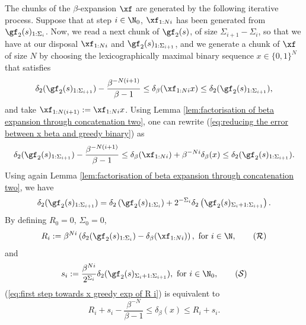 The chunks of the $\beta$-expansion $\xf$ are generated by the following iterative process. Suppose that at step $i \in \N_0$, $\xf_{1:Ni}$ has been generated from $\gf_2(s)_{1:\Sigma_i}$. Now, we read a next chunk of $\gf_2(s)$, of size $\Sigma_{i+1}-\Sigma_i$, so that we have at our disposal $\xf_{1:Ni}$ and $\gf_2(s)_{1:\Sigma_{i+1}}$, and we generate a chunk of $\xf$ of size $N$ by choosing the lexicographically maximal binary sequence $x \in \{0,1\}^N$ that satisfies 
\begin{equation}\label{eq:reducing the error between x beta and greedy binary}
	\delta_2(\gf_2(s)_{1:\Sigma_{i+1}}) - \frac{\beta^{-N(i+1)}}{\beta - 1} \leq \delta_\beta(\xf_{1:Ni}x) \leq \delta_2(\gf_2(s)_{1:\Sigma_{i+1}}),
\end{equation}
and take $\xf_{1:N(i+1)} := \xf_{1:Ni} x$. Using Lemma \ref{lem:factorisation of beta expansion through concatenation two}, one can rewrite (\ref{eq:reducing the error between x beta and greedy binary}) as
\begin{equation}\label{eq:first step towards x greedy exp of R i}
	\delta_2(\gf_2(s)_{1:\Sigma_{i+1}}) - \frac{\beta^{-N(i+1)}}{\beta - 1} \leq \delta_\beta(\xf_{1:Ni}) + \beta^{-Ni} \delta_\beta(x) \leq \delta_2(\gf_2(s)_{1:\Sigma_{i+1}}).
\end{equation}
Using again Lemma \ref{lem:factorisation of beta expansion through concatenation two}, we have
\begin{equation}\label{eq:factorisation binary expansion}
	\delta_2(\gf_2(s)_{1:\Sigma_{i+1}}) = \delta_2\left(\gf_2(s)_{1:\Sigma_{i}}\right) + 2^{-\Sigma_i}\delta_2\left(\gf_2(s)_{\Sigma_i+1:\Sigma_{i+1}}\right).
\end{equation}
By defining $R_0 = 0$, $\Sigma_0 = 0$,
\begin{equation}\label{eq:R i definition}
	R_i := \beta^{Ni}\left(\delta_2(\gf_2(s)_{1:\Sigma_{i}}) - \delta_\beta(\xf_{1:Ni})\right), \ \text{for} \ i \in \N,
	\tag{\text{$\mathcal{R}$}}
\end{equation}
and
\begin{equation}\label{eq:s i to generate beta expansion}
	s_i := \frac{\beta^{Ni}}{2^{\Sigma_i}}\delta_2(\gf_2(s)_{\Sigma_i+1:\Sigma_{i+1}}), \ \text{for} \ i \in \N_0,
	\tag{\text{$\mathcal{S}$}}
\end{equation}
(\ref{eq:first step towards x greedy exp of R i}) is equivalent to 
\begin{equation}\label{eq:greedy exp for x}
	R_i + s_i - \frac{\beta^{-N}}{\beta-1} \leq \delta_\beta(x) \leq R_i + s_i.
\end{equation}
